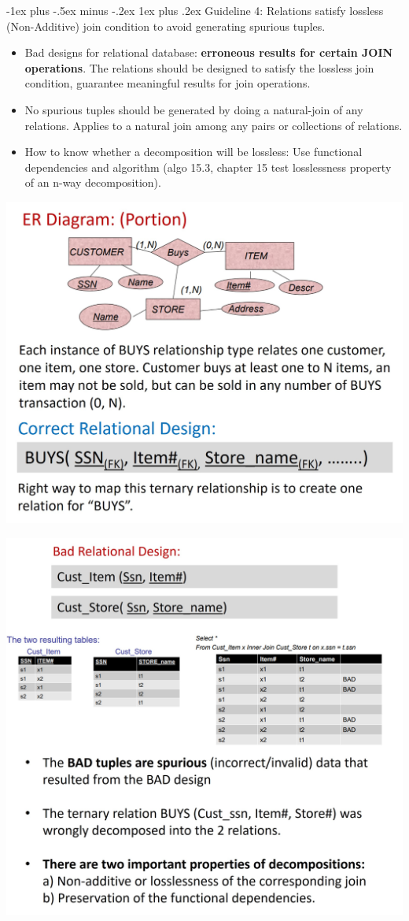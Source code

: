 \documentclass[12pt, landscape]{article}
\makeatletter
\renewcommand{\subsubsection}{\@startsection{subsubsection}{3}{0.1mm}%
                                {-1ex plus -.5ex minus -.2ex}%
                                {1ex plus .2ex}%
                                {\normalfont\small\bfseries}}
\makeatother
\begin{document}
\begin{multicols*}{3}
\subsubsection{Guideline 4: Relations satisfy lossless (Non-Additive) join condition to avoid generating spurious tuples.}
\begin{itemize}
\item Bad designs for relational database: \textbf{erroneous results for certain JOIN operations}. The relations should be designed to satisfy the 
lossless join condition, guarantee meaningful results for join operations.
\item No spurious tuples should be generated by doing 
a natural-join of any relations. Applies to a natural join among any pairs or collections of relations.
\item How to know whether a decomposition will be lossless: Use functional dependencies and algorithm (algo 15.3, chapter 15 test losslessness property of an n-way decomposition).
\end{itemize}
\centerline{\includegraphics[width = 0.85\linewidth]{guideline4}}
\smallskip
\centerline{\includegraphics[width = 0.95\linewidth]{guideline4-1}}


\end{multicols*}
\end{document}
